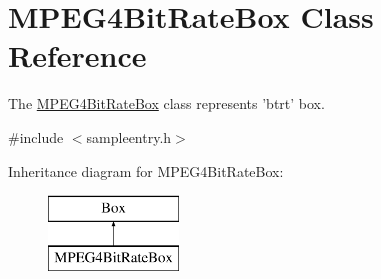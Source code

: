 \hypertarget{class_m_p_e_g4_bit_rate_box}{\section{M\-P\-E\-G4\-Bit\-Rate\-Box Class Reference}
\label{class_m_p_e_g4_bit_rate_box}
}


The \hyperlink{class_m_p_e_g4_bit_rate_box}{M\-P\-E\-G4\-Bit\-Rate\-Box} class represents 'btrt' box.  




{\ttfamily \#include $<$sampleentry.\-h$>$}

Inheritance diagram for M\-P\-E\-G4\-Bit\-Rate\-Box\-:\begin{figure}[H]
\begin{center}
\leavevmode
\includegraphics[height=2.000000cm]{class_m_p_e_g4_bit_rate_box}
\end{center}
\end{figure}
